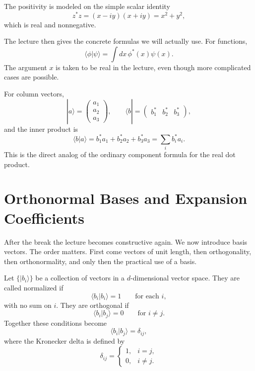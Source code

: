 The positivity is modeled on the simple scalar identity
\begin{equation}
z^* z = (x-iy)(x+iy) = x^2 + y^2,
\end{equation}
which is real and nonnegative.

The lecture then gives the concrete formulas we will actually use. For functions,
\begin{equation}
\langle \phi|\psi\rangle
=
\int dx\, \phi^*(x)\psi(x).
\end{equation}
The argument \(x\) is taken to be real in the lecture, even though more complicated cases are possible.

For column vectors,
\begin{equation}
|a\rangle
=
\left(
\begin{array}{c}
a_1\\
a_2\\
a_3
\end{array}
\right),
\qquad
\langle b|
=
\left(
\begin{array}{ccc}
b_1^* & b_2^* & b_3^*
\end{array}
\right),
\end{equation}
and the inner product is
\begin{equation}
\langle b|a\rangle = b_1^* a_1 + b_2^* a_2 + b_3^* a_3 = \sum_i b_i^* a_i.
\end{equation}
This is the direct analog of the ordinary component formula for the real dot product.

\section{Orthonormal Bases and Expansion Coefficients}

After the break the lecture becomes constructive again. We now introduce basis vectors. The order matters. First come vectors of unit length, then orthogonality, then orthonormality, and only then the practical use of a basis.

Let \(\{|b_i\rangle\}\) be a collection of vectors in a \(d\)-dimensional vector space. They are called normalized if
\begin{equation}
\langle b_i|b_i\rangle = 1
\qquad
\text{for each } i,
\end{equation}
with no sum on \(i\). They are orthogonal if
\begin{equation}
\langle b_i|b_j\rangle = 0
\qquad
\text{for } i \neq j.
\end{equation}
Together these conditions become
\begin{equation}
\langle b_i|b_j\rangle = \delta_{ij},
\end{equation}
where the Kronecker delta is defined by
\begin{equation}
\delta_{ij}
=
\left\{
\begin{array}{ll}
1, & i=j,\\
0, & i\neq j.
\end{array}
\right.
\end{equation}

